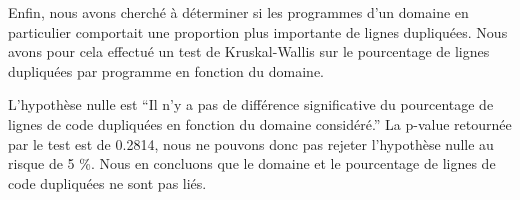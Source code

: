 Enfin, nous avons cherché à déterminer si les programmes d'un domaine en
particulier comportait une proportion plus importante de lignes
dupliquées. Nous avons pour cela effectué un test de Kruskal-Wallis
sur le pourcentage de lignes dupliquées par programme en fonction du
domaine.

L'hypothèse nulle est ``Il n'y a pas de différence significative du
pourcentage de lignes de code dupliquées en fonction du domaine
considéré.'' La p-value retournée par le test est de 0.2814, nous ne
pouvons donc pas rejeter l'hypothèse nulle au risque de 5 \%. Nous en
concluons que le domaine et le pourcentage de lignes de code
dupliquées ne sont pas liés. 
